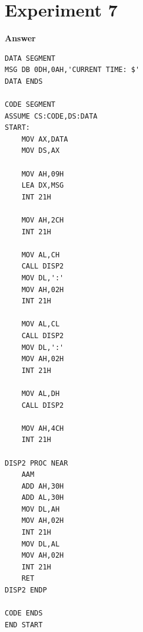 \documentclass[11pt,a4paper]{article}
\begin{document}
\section*{Experiment 7}
\noindent{}
\vspace{0.4em}
\noindent\textbf{Answer}
\begin{lstlisting}[style=asmbase]
DATA SEGMENT
MSG DB 0DH,0AH,'CURRENT TIME: $'
DATA ENDS

CODE SEGMENT
ASSUME CS:CODE,DS:DATA
START:
    MOV AX,DATA
    MOV DS,AX

    MOV AH,09H
    LEA DX,MSG
    INT 21H

    MOV AH,2CH
    INT 21H

    MOV AL,CH
    CALL DISP2
    MOV DL,':'
    MOV AH,02H
    INT 21H

    MOV AL,CL
    CALL DISP2
    MOV DL,':'
    MOV AH,02H
    INT 21H

    MOV AL,DH
    CALL DISP2

    MOV AH,4CH
    INT 21H

DISP2 PROC NEAR
    AAM
    ADD AH,30H
    ADD AL,30H
    MOV DL,AH
    MOV AH,02H
    INT 21H
    MOV DL,AL
    MOV AH,02H
    INT 21H
    RET
DISP2 ENDP

CODE ENDS
END START
\end{lstlisting}
\end{document}
